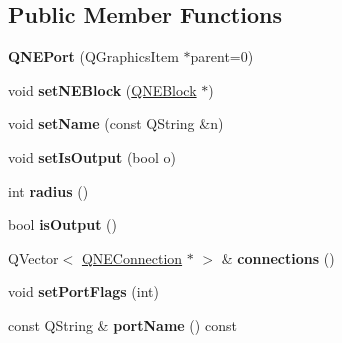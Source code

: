 \subsection*{Public Member Functions}
\begin{DoxyCompactItemize}
\item 
\hypertarget{class_q_n_e_port_a7ca5ae980d6809a5e6994c338db194ac}{{\bfseries Q\-N\-E\-Port} (Q\-Graphics\-Item $\ast$parent=0)}\label{class_q_n_e_port_a7ca5ae980d6809a5e6994c338db194ac}

\item 
\hypertarget{class_q_n_e_port_ac7d1d1c0b7b55e77b640dfb80681be4d}{void {\bfseries set\-N\-E\-Block} (\hyperlink{class_q_n_e_block}{Q\-N\-E\-Block} $\ast$)}\label{class_q_n_e_port_ac7d1d1c0b7b55e77b640dfb80681be4d}

\item 
\hypertarget{class_q_n_e_port_a53712f6bdf37af5f320bdb98fb61ca3a}{void {\bfseries set\-Name} (const Q\-String \&n)}\label{class_q_n_e_port_a53712f6bdf37af5f320bdb98fb61ca3a}

\item 
\hypertarget{class_q_n_e_port_a03cb578313db7dcc02ae71ce255c8828}{void {\bfseries set\-Is\-Output} (bool o)}\label{class_q_n_e_port_a03cb578313db7dcc02ae71ce255c8828}

\item 
\hypertarget{class_q_n_e_port_a0cd04e3c29946b03f9be7515c45a5dde}{int {\bfseries radius} ()}\label{class_q_n_e_port_a0cd04e3c29946b03f9be7515c45a5dde}

\item 
\hypertarget{class_q_n_e_port_aeabbbd177088c1b8c677b840059afd2c}{bool {\bfseries is\-Output} ()}\label{class_q_n_e_port_aeabbbd177088c1b8c677b840059afd2c}

\item 
\hypertarget{class_q_n_e_port_aedd757c36a252a8db6d96cf2f2c30212}{Q\-Vector$<$ \hyperlink{class_q_n_e_connection}{Q\-N\-E\-Connection} $\ast$ $>$ \& {\bfseries connections} ()}\label{class_q_n_e_port_aedd757c36a252a8db6d96cf2f2c30212}

\item 
\hypertarget{class_q_n_e_port_a72547f77d8b6fef4131734a408f33ea3}{void {\bfseries set\-Port\-Flags} (int)}\label{class_q_n_e_port_a72547f77d8b6fef4131734a408f33ea3}

\item 
\hypertarget{class_q_n_e_port_a91c19714936714a79b009be92341073e}{const Q\-String \& {\bfseries port\-Name} () const }\label{class_q_n_e_port_a91c19714936714a79b009be92341073e}


\end{DoxyCompactItemize}
